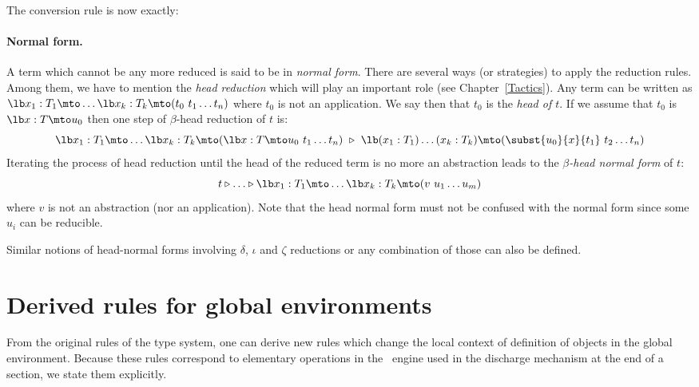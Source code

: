 The conversion rule is now exactly:

\begin{description}\label{Conv}
\item[Conv]
  \end{description}


\paragraph[Normal form.]{Normal form.\label{Normal-form}\label{Head-normal-form}}
A term which cannot be any more reduced is said to be in {\em normal
  form}. There are several ways (or strategies) to apply the reduction
rules. Among them, we have to mention the {\em head reduction} which
will play an important role (see Chapter~\ref{Tactics}). Any term can
be written as $\lb x_1:T_1\mto \ldots \lb x_k:T_k \mto
(t_0\ t_1\ldots t_n)$ where
$t_0$ is not an application. We say then that $t_0$ is the {\em head
  of $t$}. If we assume that $t_0$ is $\lb x:T\mto u_0$ then one step of
$\beta$-head reduction of $t$ is:
\[\lb x_1:T_1\mto \ldots \lb x_k:T_k\mto (\lb x:T\mto u_0\ t_1\ldots t_n)
~\triangleright ~ \lb (x_1:T_1)\ldots(x_k:T_k)\mto
(\subst{u_0}{x}{t_1}\ t_2 \ldots t_n)\]
Iterating the process of head reduction until the head of the reduced
term is no more an abstraction leads to the {\em $\beta$-head normal
  form} of $t$:
\[ t \triangleright \ldots \triangleright
\lb x_1:T_1\mto \ldots\lb x_k:T_k\mto (v\ u_1
\ldots u_m)\]
where $v$ is not an abstraction (nor an application).  Note that the
head normal form must not be confused with the normal form since some
$u_i$ can be reducible.

Similar notions of head-normal forms involving $\delta$, $\iota$ and $\zeta$
reductions or any combination of those can also be defined.

\section{Derived rules for global environments}

From the original rules of the type system, one can derive new rules
which change the local context of definition of objects in the global environment.
Because these rules correspond to elementary operations in the \Coq\ 
engine used in the discharge mechanism at the end of a section, we
state them explicitly.

